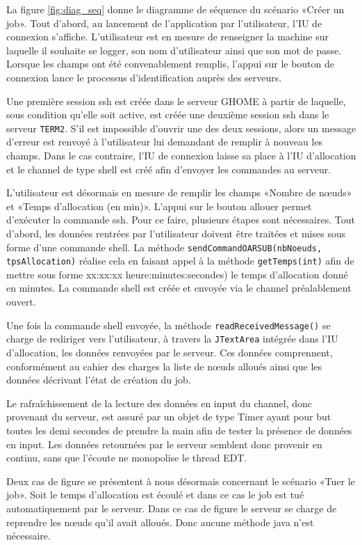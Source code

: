 \par La figure \ref{fig:diag_seq} donne le diagramme de séquence du scénario «Créer un job».  Tout d'abord, au lancement de l’application par l’utilisateur, l’IU de connexion s’affiche. L’utilisateur est en mesure de renseigner la machine sur laquelle il souhaite se logger, son nom d’utilisateur ainsi que son mot de passe. Lorsque les champs ont été convenablement remplis, l’appui sur le bouton de connexion lance le processus d’identification auprès des serveurs.
\par Une première session ssh est créée dans le serveur GHOME à partir de laquelle, sous condition qu’elle soit active, est créée une deuxième session ssh dans le serveur \texttt{TERM2}. S’il est impossible d’ouvrir une des deux sessions, alors un message d’erreur est renvoyé à l’utilisateur lui demandant de remplir à nouveau les champs. Dans le cas contraire, l’IU de connexion laisse sa place à l’IU d’allocation et le channel de type shell est créé afin d’envoyer les commandes au serveur.
\par L’utilisateur est désormais en mesure de remplir les champs «Nombre de nœuds» et «Temps d’allocation (en min)». L’appui sur le bouton allouer permet d’exécuter la commande ssh. Pour ce faire, plusieurs étapes sont nécessaires. Tout d’abord, les données rentrées par l’utilisateur doivent être traitées et mises sous forme d’une commande shell. La méthode \texttt{sendCommandOARSUB(nbNoeuds, tpsAllocation)} réalise cela en faisant appel à la méthode \texttt{getTemps(int)} afin de mettre sous forme xx:xx:xx heure:minutes:secondes) le temps d’allocation donné en minutes. La commande shell est créée et envoyée via le channel préalablement ouvert.
\par Une fois la commande shell envoyée, la méthode \texttt{readReceivedMessage()} se charge de rediriger vers l’utilisateur, à travers la \texttt{JTextArea} intégrée dans l’IU d’allocation, les données  renvoyées par le serveur. Ces données comprennent, conformément au cahier des charges la liste de nœuds alloués ainsi que les données décrivant l’état de création du job. 
\par Le rafraîchissement de la lecture des données en input du channel, donc provenant du serveur, est assuré par un objet de type Timer ayant pour but toutes les demi secondes de prendre la main afin de tester la présence de données en input. Les données retournées par le serveur semblent donc provenir en continu, sans que l'écoute ne monopolise le thread EDT.
\par Deux cas de figure se présentent à nous désormais concernant le scénario «Tuer le job». Soit le temps d’allocation est écoulé et dans ce cas le job est tué automatiquement par le serveur. Dans ce cas de figure le serveur se charge de reprendre les nœuds qu’il avait alloués. Donc aucune méthode java n’est nécessaire. 
